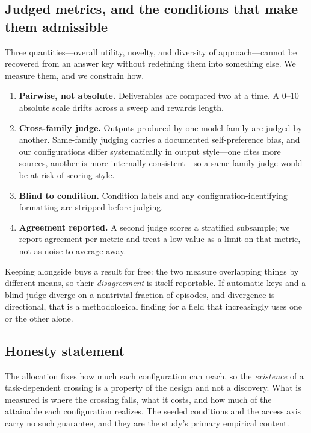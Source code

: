 \subsection{Judged metrics, and the conditions that make them admissible}
\label{sec:judged}

Three quantities---overall utility, novelty, and diversity of approach---cannot be
recovered from an answer key without redefining them into something else. We measure
them, and we constrain how.

\begin{enumerate}[leftmargin=1.4em,itemsep=1pt,topsep=2pt]
\item \textbf{Pairwise, not absolute.} Deliverables are compared two at a time. A
      0--10 absolute scale drifts across a sweep and rewards length.
\item \textbf{Cross-family judge.} Outputs produced by one model family are judged by
      another. Same-family judging carries a documented self-preference bias, and our
      configurations differ systematically in output style---one cites more sources,
      another is more internally consistent---so a same-family judge would be at risk
      of scoring style.
\item \textbf{Blind to condition.} Condition labels and any configuration-identifying
      formatting are stripped before judging.
\item \textbf{Agreement reported.} A second judge scores a stratified subsample; we
      report agreement per metric and treat a low value as a limit on that metric, not
      as noise to average away.
\end{enumerate}

Keeping  alongside  buys a result for
free: the two measure overlapping things by different means, so their
\emph{disagreement} is itself reportable. If automatic keys and a blind judge diverge
on a nontrivial fraction of episodes, and divergence is directional, that is a
methodological finding for a field that increasingly uses one or the other alone.

\subsection{Honesty statement}

The allocation fixes how much each configuration can reach, so the \emph{existence}
of a task-dependent crossing is a property of the design and not a discovery. What is
measured is where the crossing falls, what it costs, and how much of the attainable
each configuration realizes. The seeded conditions and the access axis carry no such
guarantee, and they are the study's primary empirical content.
